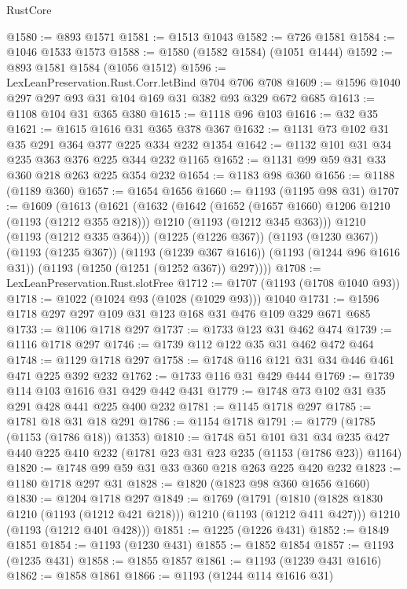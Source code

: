 \begin{lexlean}{RustCore}
\begin{coremodule}
@1580 := @893 @1571
@1581 := @1513 @1043
@1582 := @726 @1581
@1584 := @1046 @1533 @1573
@1588 := @1580 (@1582 @1584) (@1051 @1444)
@1592 := @893 @1581 @1584 (@1056 @1512)
@1596 := LexLeanPreservation.Rust.Corr.letBind @704 @706 @708
@1609 := @1596 @1040 @297 @297 @93 @31 @104 @169 @31 @382 @93 @329 @672 @685
@1613 := @1108 @104 @31 @365 @380
@1615 := @1118 @96 @103
@1616 := @32 @35
@1621 := @1615 @1616 @31 @365 @378 @367
@1632 := @1131 @73 @102 @31 @35 @291 @364 @377 @225 @334 @232 @1354
@1642 := @1132 @101 @31 @34 @235 @363 @376 @225 @344 @232 @1165
@1652 := @1131 @99 @59 @31 @33 @360 @218 @263 @225 @354 @232
@1654 := @1183 @98 @360
@1656 := @1188 (@1189 @360)
@1657 := @1654 @1656
@1660 := @1193 (@1195 @98 @31)
@1707 := @1609
    (@1613
      (@1621
        (@1632
          (@1642
            (@1652 (@1657 @1660) @1206 @1210 (@1193 (@1212 @355 @218)))
            @1210
            (@1193 (@1212 @345 @363)))
          @1210
          (@1193 (@1212 @335 @364)))
        (@1225 (@1226 @367))
        (@1193 (@1230 @367))
        (@1193 (@1235 @367))
        (@1193 (@1239 @367 @1616))
        (@1193 (@1244 @96 @1616 @31))
        (@1193 (@1250 (@1251 (@1252 @367)) @297))))
@1708 := LexLeanPreservation.Rust.slotFree
@1712 := @1707 (@1193 (@1708 @1040 @93))
@1718 := @1022 (@1024 @93 (@1028 (@1029 @93))) @1040
@1731 := @1596 @1718 @297 @297 @109 @31 @123 @168 @31 @476 @109 @329 @671 @685
@1733 := @1106 @1718 @297
@1737 := @1733 @123 @31 @462 @474
@1739 := @1116 @1718 @297
@1746 := @1739 @112 @122 @35 @31 @462 @472 @464
@1748 := @1129 @1718 @297
@1758 := @1748 @116 @121 @31 @34 @446 @461 @471 @225 @392 @232
@1762 := @1733 @116 @31 @429 @444
@1769 := @1739 @114 @103 @1616 @31 @429 @442 @431
@1779 := @1748 @73 @102 @31 @35 @291 @428 @441 @225 @400 @232
@1781 := @1145 @1718 @297
@1785 := @1781 @18 @31 @18 @291
@1786 := @1154 @1718
@1791 := @1779 (@1785 (@1153 (@1786 @18)) @1353)
@1810 := @1748
    @51
    @101
    @31
    @34
    @235
    @427
    @440
    @225
    @410
    @232
    (@1781 @23 @31 @23 @235 (@1153 (@1786 @23)) @1164)
@1820 := @1748 @99 @59 @31 @33 @360 @218 @263 @225 @420 @232
@1823 := @1180 @1718 @297 @31
@1828 := @1820 (@1823 @98 @360 @1656 @1660)
@1830 := @1204 @1718 @297
@1849 := @1769
    (@1791
      (@1810 (@1828 @1830 @1210 (@1193 (@1212 @421 @218))) @1210 (@1193 (@1212 @411 @427)))
      @1210
      (@1193 (@1212 @401 @428)))
@1851 := @1225 (@1226 @431)
@1852 := @1849 @1851
@1854 := @1193 (@1230 @431)
@1855 := @1852 @1854
@1857 := @1193 (@1235 @431)
@1858 := @1855 @1857
@1861 := @1193 (@1239 @431 @1616)
@1862 := @1858 @1861
@1866 := @1193 (@1244 @114 @1616 @31)

\end{coremodule}
\end{lexlean}
